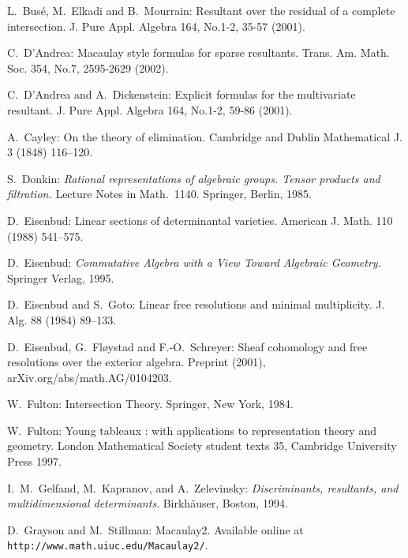 \documentclass{jams-l}
\theoremstyle{definition}
\theoremstyle{remark}
\begin{document}
\begin{thebibliography}{}
L.~Bus\'e, M.~Elkadi and B.~Mourrain:
Resultant over the residual of a complete intersection. 
J. Pure Appl. Algebra 164, No.1-2, 35-57 (2001). 

C.~D'Andrea:
Macaulay style formulas for sparse resultants.
Trans. Am. Math. Soc. 354, No.7, 2595-2629 (2002).

C.~D'Andrea and A.~Dickenstein:
Explicit formulas for the multivariate resultant.
J. Pure Appl. Algebra 164, No.1-2, 59-86 (2001).

A.~Cayley: On the theory of elimination. Cambridge and Dublin
Mathematical J. 3 (1848) 116--120.

S.~Donkin: {\it Rational representations of algebraic groups.
Tensor products and filtration.}
Lecture Notes in Math.~1140.
Springer, Berlin, 1985. 

D.~Eisenbud: Linear sections of determinantal varieties.
American J. Math. 110 (1988) 541--575.

D.~Eisenbud: {\it Commutative Algebra with a View Toward 
Algebraic Geometry.} Springer Verlag, 1995.

D.~Eisenbud and S.~Goto: Linear free resolutions and minimal
multiplicity.  J. Alg. 88 (1984) 89--133.

D.~Eisenbud, G.~Fl\o ystad and F.-O.~Schreyer: Sheaf cohomology and free
resolutions over the exterior algebra. Preprint (2001), 
arXiv.org/abs/math.AG/0104203.

W.~Fulton: Intersection Theory.
Springer, New York, 1984.

W.~Fulton: Young tableaux : with applications to representation theory and
geometry. 
London Mathematical Society student texts 35,
Cambridge University Press 1997.

I.~M.~Gelfand, M.~Kapranov, and A.~Zelevinsky: 
{\it Discriminants, resultants, and multidimensional determinants}.
Birkh\"auser, Boston, 1994.

D.~Grayson and M.~Stillman: Macaulay2.
Available online at
\texttt{http://www.math.uiuc.edu/\linebreak Macaulay2/}.


\end{thebibliography}
\end{document}
